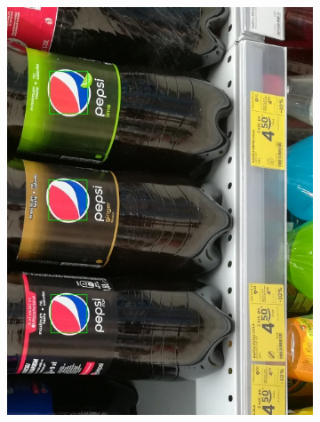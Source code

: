 \documentclass[11pt,a4paper,twoside]{report}
\begin{document}
	\begin{figure}
	    \centering
	    \begin{subfigure}[b]{0.48\textwidth}
	        \includegraphics[width=\textwidth]{img/camera/15}
	    \end{subfigure}
	    ~
	    \begin{subfigure}[b]{0.48\textwidth}

\end{subfigure}
\end{figure}
\end{document}
